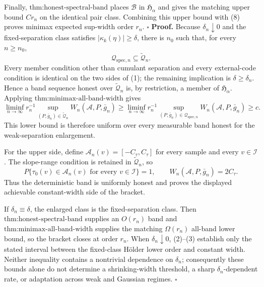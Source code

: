Finally, \(\text{thm:honest-spectral-band}\) places \(\mathcal B\) in \(\mathfrak H_\alpha\) and gives the matching upper bound \(Cr_n\) on the identical pair class.  Combining this upper bound with (8) proves minimax expected sup-width order \(r_n\). \(\square\)
\textbf{Proof.}
Because \(\delta_n\downarrow0\) and the fixed-separation class satisfies \(|\kappa_k(\eta)|\ge\delta\), there is \(n_0\) such that, for every \(n\ge n_0\),
\[
 \mathcal Q_{\mathrm{spec},n}\subseteq\widetilde{\mathcal Q}_n. \tag{1}
\]
Every member condition other than cumulant separation and every external-code condition is identical on the two sides of (1); the remaining implication is \(\delta\ge\delta_n\).  Hence a band sequence honest over \(\widetilde{\mathcal Q}_n\) is, by restriction, a member of \(\mathfrak H_\alpha\).  Applying \(\text{thm:minimax-all-band-width}\) gives
\[
 \liminf_{n\to\infty}r_n^{-1}
 \sup_{(P,\bar g_n)\in\widetilde{\mathcal Q}_n}
 W_n(\mathcal A,P,\bar g_n)
 \ge
 \liminf_{n\to\infty}r_n^{-1}
 \sup_{(P,\bar g_n)\in\mathcal Q_{\mathrm{spec},n}}
 W_n(\mathcal A,P,\bar g_n)
 \ge c. \tag{2}
\]
This lower bound is therefore uniform over every measurable band honest for the weak-separation enlargement.

For the upper side, define \(\mathcal A_n(v)=[-C_\tau,C_\tau]\) for every sample and every \(v\in\mathcal I\).  The slope-range condition is retained in \(\widetilde{\mathcal Q}_n\), so
\[
 P\{\tau_0(v)\in\mathcal A_n(v)\text{ for every }v\in\mathcal I\}=1,
 \qquad
 W_n(\mathcal A,P,\bar g_n)=2C_\tau. \tag{3}
\]
Thus the deterministic band is uniformly honest and proves the displayed achievable constant-width side of the bracket.

If \(\delta_n\equiv\delta\), the enlarged class is the fixed-separation class.  Then \(\text{thm:honest-spectral-band}\) supplies an \(O(r_n)\) band and \(\text{thm:minimax-all-band-width}\) supplies the matching \(\Omega(r_n)\) all-band lower bound, so the bracket closes at order \(r_n\).  When \(\delta_n\downarrow0\), (2)--(3) establish only the stated interval between the fixed-class Hölder lower order and constant width.  Neither inequality contains a nontrivial dependence on \(\delta_n\); consequently these bounds alone do not determine a shrinking-width threshold, a sharp \(\delta_n\)-dependent rate, or adaptation across weak and Gaussian regimes. \(\square\)

